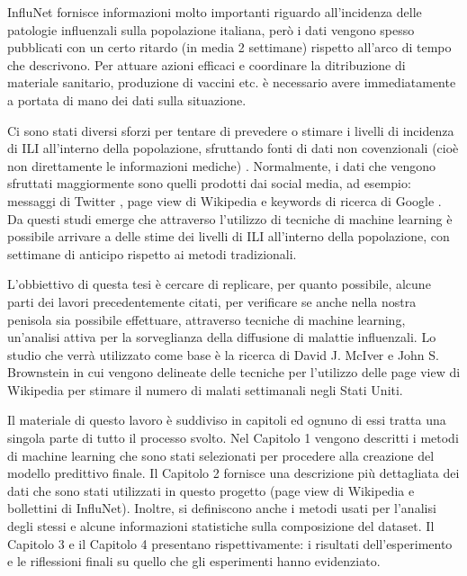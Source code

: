InfluNet fornisce informazioni molto importanti riguardo all'incidenza delle patologie influenzali sulla popolazione
italiana, però i dati vengono spesso pubblicati con un certo ritardo (in media 2 settimane) rispetto all'arco di tempo che 
descrivono. Per attuare azioni efficaci e coordinare la ditribuzione di materiale sanitario, produzione di vaccini etc. è 
necessario avere immediatamente a portata di mano dei dati sulla situazione. 
\bigskip

Ci sono stati diversi sforzi per tentare di prevedere o stimare i livelli di incidenza di ILI all'interno della popolazione,
sfruttando fonti di dati non covenzionali (cioè non direttamente le informazioni mediche) \cite{McIver2014, Hickmann2015, Generous2014, googleflutrends, Signorini2011}. Normalmente, i dati che vengono sfruttati 
maggiormente sono quelli prodotti dai social media, ad esempio: messaggi di Twitter \cite{Signorini2011}, page view di 
Wikipedia \cite{McIver2014, Hickmann2015, Generous2014} e keywords di ricerca di Google \cite{googleflutrends}. Da questi 
studi emerge che attraverso l'utilizzo di tecniche di machine learning è possibile arrivare a delle stime dei livelli di ILI 
all'interno della popolazione, con settimane di anticipo rispetto ai metodi tradizionali.
\bigskip

L'obbiettivo di questa tesi è cercare di replicare, per quanto possibile, alcune parti dei lavori precedentemente citati, per
verificare se anche nella nostra penisola sia possibile effettuare, attraverso tecniche di machine learning, un'analisi
attiva per la sorveglianza della diffusione di malattie influenzali. Lo studio che verrà utilizzato come base 
è la ricerca di David J. McIver e John S. Brownstein \cite{McIver2014} in cui vengono delineate delle tecniche per 
l'utilizzo delle page view di Wikipedia per stimare il numero di malati settimanali negli Stati Uniti.
\bigskip

Il materiale di questo lavoro è suddiviso in capitoli ed ognuno di essi tratta una singola parte di tutto il processo svolto. 
Nel Capitolo 1 vengono descritti i metodi di machine learning che sono stati selezionati per procedere alla creazione
del modello predittivo finale.
Il Capitolo 2 fornisce una descrizione più dettagliata dei dati che sono stati utilizzati in questo progetto
(page view di Wikipedia e bollettini di InfluNet). Inoltre, si definiscono anche i metodi usati per l'analisi degli stessi e 
alcune informazioni statistiche sulla composizione del dataset.
Il Capitolo 3 e il Capitolo 4 presentano rispettivamente: i risultati dell'esperimento e le riflessioni finali su quello che
gli esperimenti hanno evidenziato.
\newpage




